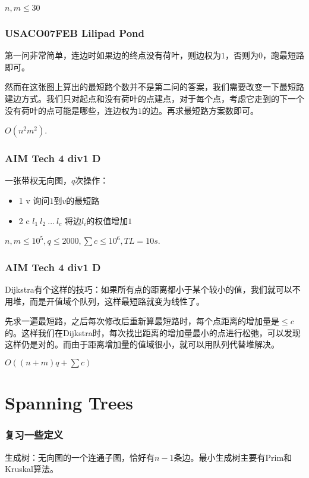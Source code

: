 \documentclass[10pt]{beamer}
\begin{document}
\begin{CJK}{UTF8}{gkai}
\begin{spacing}{1.1}
\begin{frame}
	$n, m \le 30$

\end{frame}

\begin{frame}
\frametitle{USACO07FEB Lilipad Pond}

	第一问非常简单，连边时如果边的终点没有荷叶，则边权为$1$，否则为$0$，跑最短路即可。\pause

	然而在这张图上算出的最短路个数并不是第二问的答案，我们需要改变一下最短路建边方式。我们只对起点和没有荷叶的点建点，对于每个点，考虑它走到的下一个没有荷叶的点可能是哪些，连边权为$1$的边。再求最短路方案数即可。

	$O(n^2m^2)$.

\end{frame}

\begin{frame}
\frametitle{AIM Tech 4 div1 D}

	一张带权无向图，$q$次操作：

	\begin{itemize}
		\item 1 v 询问$1$到$v$的最短路
		\item 2 c $l_1\ l_2\ ...\ l_c$ 将边$l_i$的权值增加$1$
	\end{itemize}

	$n, m \le 10^5, q \le 2000, \sum c \le 10^6, TL = 10s$.

\end{frame}

\begin{frame}
\frametitle{AIM Tech 4 div1 D}

	Dijkstra有个这样的技巧：如果所有点的距离都小于某个较小的值，我们就可以不用堆，而是开值域个队列，这样最短路就变为线性了。\pause

	先求一遍最短路，之后每次修改后重新算最短路时，每个点距离的增加量是$\le c$的。这样我们在Dijkstra时，每次找出距离的增加量最小的点进行松弛，可以发现这样仍是对的。而由于距离增加量的值域很小，就可以用队列代替堆解决。

	$O((n + m)q + \sum c)$

\end{frame}

\section{Spanning Trees}

\begin{frame}
\frametitle{复习一些定义}

	生成树：无向图的一个连通子图，恰好有$n - 1$条边。最小生成树主要有Prim和Kruskal算法。\pause
	

\end{frame}
\end{spacing}
\end{CJK}
\end{document}
